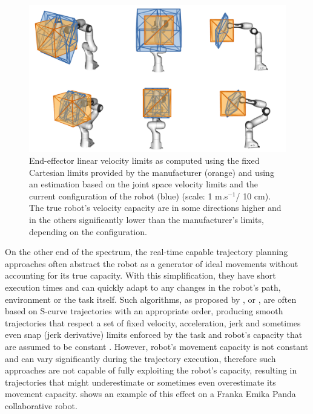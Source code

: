 \begin{figure}[!t]
    \centering
    \includegraphics[width=0.8\linewidth]{Papers/imgs/comp_poly2.png}
    \caption{End-effector linear velocity limits as computed using the fixed Cartesian limits provided by the manufacturer (orange) and using an estimation based on the joint space velocity limits and the current configuration of the robot (blue) (scale: 1 m.s$^{-1}$/ 10 cm). The true robot's velocity capacity are in some directions higher and in the others significantly lower than the manufacturer's limits, depending on the configuration.}
    \label{fig:comp_cube_poly}
\end{figure}



On the other end of the spectrum, the real-time capable trajectory planning approaches often abstract the robot as a generator of ideal movements without accounting for its true capacity. With this simplification, they have short execution times and can quickly adapt to any changes in the robot's path, environment or the task itself. Such algorithms, as proposed by \citet{Macfarlane2003}, \citet{haschke2008line} or \citet{Svarny2022}, are often based on S-curve trajectories \cite{FANG2019} with an appropriate order, producing smooth trajectories that respect a set of fixed velocity, acceleration, jerk and sometimes even snap (jerk derivative) limits enforced by the task and robot's capacity that are assumed to be constant \cite{modernrobotics}. However, robot's movement capacity is not constant and can vary significantly during the trajectory execution, therefore such approaches are not capable of fully exploiting the robot's capacity, resulting in trajectories that might underestimate or sometimes even overestimate its movement capacity.  shows an example of this effect on a Franka Emika Panda collaborative robot.


